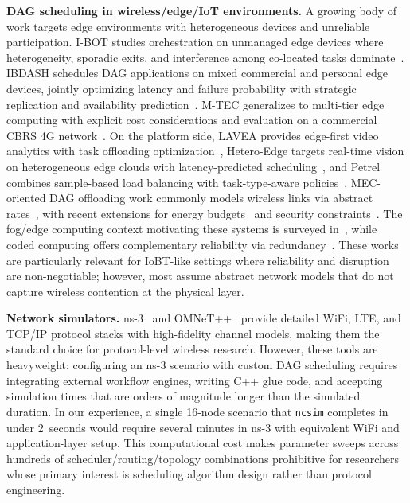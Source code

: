 \documentclass[conference]{IEEEtran}
\newcommand{\ncsim}{\texttt{ncsim}}
\begin{document}
\textbf{DAG scheduling in wireless/edge/IoT environments.}
A growing body of work targets edge environments with heterogeneous devices
and unreliable participation.
I-BOT studies orchestration on unmanaged edge devices where heterogeneity,
sporadic exits, and interference among co-located tasks
dominate~\cite{Suryavansh2020IBOT}.
IBDASH schedules DAG applications on mixed commercial and personal edge
devices, jointly optimizing latency and failure probability with strategic
replication and availability prediction~\cite{Li2022IBDASH}.
M-TEC generalizes to multi-tier edge computing with explicit cost
considerations and evaluation on a commercial CBRS 4G
network~\cite{Li2024MTEC}.
On the platform side, LAVEA provides edge-first video analytics with task
offloading optimization~\cite{Yi2017LAVEA}, Hetero-Edge targets real-time
vision on heterogeneous edge clouds with latency-predicted
scheduling~\cite{Zhang2019HeteroEdge}, and Petrel combines sample-based load
balancing with task-type-aware policies~\cite{Lin2019Petrel}.
MEC-oriented DAG offloading work commonly models wireless links via abstract
rates~\cite{Liang2021JointOffloading}, with recent extensions for energy
budgets~\cite{Li2024EnergyConstrained} and security
constraints~\cite{Long2025SecDS}.
The fog/edge computing context motivating these systems is surveyed
in~\cite{Chiang2016FogIoT,Chiang2017Fog10Q}, while coded computing offers
complementary reliability via redundancy~\cite{Kim2020CodedEdge}.
These works are particularly relevant for IoBT-like settings where
reliability and disruption are non-negotiable; however, most assume abstract
network models that do not capture wireless contention at the physical layer.

\textbf{Network simulators.}
ns-3~\cite{ns3} and OMNeT++~\cite{omnetpp} provide detailed WiFi,
LTE, and TCP/IP protocol stacks with high-fidelity channel models, making
them the standard choice for protocol-level wireless research.
However, these tools are heavyweight: configuring an ns-3 scenario with
custom DAG scheduling requires integrating external workflow engines,
writing C++ glue code, and accepting simulation times that are orders of
magnitude longer than the simulated duration.  In our experience, a single
16-node scenario that \ncsim{} completes in under 2~seconds would require
several minutes in ns-3 with equivalent WiFi and application-layer setup.
This computational cost makes parameter sweeps across hundreds of
scheduler/routing/topology combinations prohibitive for researchers whose
primary interest is scheduling algorithm design rather than protocol
engineering.
\end{document}
